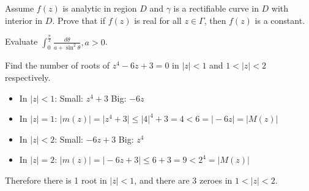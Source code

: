\documentclass[12pt]{article}
\begin{document}
\begin{statement}[9]
  Assume $f(z)$ is analytic in region $D$ and $\gamma$ is a rectifiable curve in $D$ with interior in $D$. 
  Prove that if $f(z)$ is real for all $z \in \Gamma$, then $f(z)$ is a constant. 
\end{statement}


\begin{statement}[10]
  Evaluate $\int^{\frac{\pi}{2}}_0 \frac{d \theta}{a+\sin^2 \theta}, a > 0$.
\end{statement}


\begin{statement}[11]
  Find the number of roots of $z^4 - 6z+3=0$ in $\vert z \vert < 1$ and $1 < \vert z \vert < 2$ respectively. 
\end{statement}
\begin{newproof}
  \begin{itemize}
    \item In $\vert z \vert < 1$:
      \subitem Small: $z^4 + 3$
      \subitem Big: $-6z$
    \item In $\vert z \vert = 1$:
      \subitem $\vert m(z) \vert = \vert z^4 + 3 \vert \leq \vert 4 \vert^4 + 3 = 4 < 6 = \vert -6z \vert = \vert M(z) \vert$
    \item In $\vert z \vert < 2$:
      \subitem Small: $-6z+3$
      \subitem Big: $z^4$
    \item In $\vert z \vert = 2$:
      \subitem $\vert m(z) \vert = \vert -6z+3 \vert \leq 6+3=9 < 2^4 = \vert M(z) \vert$
  \end{itemize}
  Therefore there is 1 root in $\vert z \vert < 1$, and there are 3 zeroes in $1 < \vert z \vert < 2$.
\end{newproof}

\end{document}
